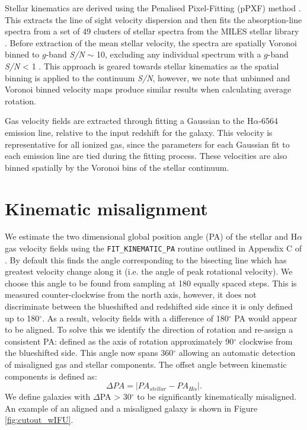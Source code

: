 Stellar kinematics are derived using the Penalised Pixel-Fitting (pPXF) method \citep{cappellari2004,cappellari2017}. This extracts the line of sight velocity dispersion and then fits the absorption-line spectra from a set of 49 clusters of stellar spectra from the MILES stellar library \citep{sanchez2006,falcon2011}. Before extraction of the mean stellar velocity, the spectra are spatially Voronoi binned to $g$-band \textit{S/N} $\sim$ 10, excluding any individual spectrum with a $g$-band \textit{S/N} < 1 \citep{cappellari2003}. This approach is geared towards stellar kinematics as the spatial binning is applied to the continuum \textit{S/N}, however, we note that unbinned and Voronoi binned velocity maps produce similar results when calculating average rotation.

Gas velocity fields are extracted through fitting a Gaussian to the H$\alpha$-6564 emission line, relative to the input redshift for the galaxy. This velocity is representative for all ionized gas, since the parameters for each Gaussian fit to each emission line are tied during the fitting process. These velocities are also binned spatially by the Voronoi bins of the stellar continuum.

\section{Kinematic misalignment} \label{sec:kin_mis}
We estimate the two dimensional global position angle (PA) of the stellar and H$\alpha$ gas velocity fields using the \texttt{FIT\_KINEMATIC\_PA} routine outlined in Appendix C of \citet{krajnovic2006}. By default this finds the angle corresponding to the bisecting line which has greatest velocity change along it (i.e. the angle of peak rotational velocity). We choose this angle to be found from sampling at 180 equally spaced steps. This is measured counter-clockwise from the north axis, however, it does not discriminate between the blueshifted and redshifted side since it is only defined up to 180$^{\circ}$. As a result, velocity fields with a difference of 180$^{\circ}$ PA would appear to be aligned. To solve this we identify the direction of rotation and re-assign a consistent PA: defined as the axis of rotation approximately 90$^{\circ}$ clockwise from the blueshifted side. This angle now spans 360$^{\circ}$ allowing an automatic detection of misaligned gas and stellar components. The offset angle between kinematic components is defined as: 
\begin{equation} \label{eq:delPA}
\Delta PA = |PA_{stellar} - PA_{H\alpha}|. 
\end{equation}
We define galaxies with $\Delta$PA > 30$^{\circ}$ to be significantly kinematically misaligned. An example of an aligned and a misaligned galaxy is shown in Figure \ref{fig:cutout_wIFU}. 

